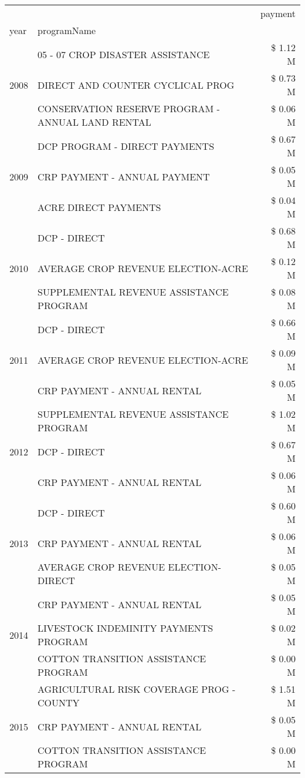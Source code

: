 \begin{tabular}{llr}
\toprule
 &  & payment \\
year & programName &  \\
\midrule
\multirow[t]{3}{*}{2008} & 05 - 07 CROP DISASTER ASSISTANCE & \$ 1.12 M \\
 & DIRECT AND COUNTER CYCLICAL PROG & \$ 0.73 M \\
 & CONSERVATION RESERVE PROGRAM - ANNUAL LAND RENTAL & \$ 0.06 M \\
\cline{1-3}
\multirow[t]{3}{*}{2009} & DCP PROGRAM - DIRECT PAYMENTS & \$ 0.67 M \\
 & CRP PAYMENT - ANNUAL PAYMENT & \$ 0.05 M \\
 & ACRE DIRECT PAYMENTS & \$ 0.04 M \\
\cline{1-3}
\multirow[t]{3}{*}{2010} & DCP - DIRECT & \$ 0.68 M \\
 & AVERAGE CROP REVENUE ELECTION-ACRE & \$ 0.12 M \\
 & SUPPLEMENTAL REVENUE ASSISTANCE PROGRAM & \$ 0.08 M \\
\cline{1-3}
\multirow[t]{3}{*}{2011} & DCP - DIRECT & \$ 0.66 M \\
 & AVERAGE CROP REVENUE ELECTION-ACRE & \$ 0.09 M \\
 & CRP PAYMENT - ANNUAL RENTAL & \$ 0.05 M \\
\cline{1-3}
\multirow[t]{3}{*}{2012} & SUPPLEMENTAL REVENUE ASSISTANCE PROGRAM & \$ 1.02 M \\
 & DCP - DIRECT & \$ 0.67 M \\
 & CRP PAYMENT - ANNUAL RENTAL & \$ 0.06 M \\
\cline{1-3}
\multirow[t]{3}{*}{2013} & DCP - DIRECT & \$ 0.60 M \\
 & CRP PAYMENT - ANNUAL RENTAL & \$ 0.06 M \\
 & AVERAGE CROP REVENUE ELECTION-DIRECT & \$ 0.05 M \\
\cline{1-3}
\multirow[t]{3}{*}{2014} & CRP PAYMENT - ANNUAL RENTAL & \$ 0.05 M \\
 & LIVESTOCK INDEMINITY PAYMENTS PROGRAM & \$ 0.02 M \\
 & COTTON TRANSITION ASSISTANCE PROGRAM & \$ 0.00 M \\
\cline{1-3}
\multirow[t]{3}{*}{2015} & AGRICULTURAL RISK COVERAGE PROG - COUNTY & \$ 1.51 M \\
 & CRP PAYMENT - ANNUAL RENTAL & \$ 0.05 M \\
 & COTTON TRANSITION ASSISTANCE PROGRAM & \$ 0.00 M \\
\cline{1-3}

\end{tabular}
